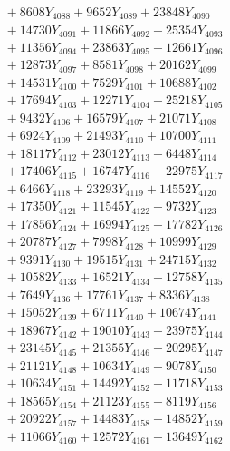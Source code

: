 \documentclass[a4paper,10pt]{article}
\begin{document}
{\begin{align}
&\;  + 8608 Y_{4088} + 9652 Y_{4089} + 23848 Y_{4090} \\[0.3ex]
&\;  + 14730 Y_{4091} + 11866 Y_{4092} + 25354 Y_{4093} \\[0.3ex]
&\;  + 11356 Y_{4094} + 23863 Y_{4095} + 12661 Y_{4096} \\[0.3ex]
&\;  + 12873 Y_{4097} + 8581 Y_{4098} + 20162 Y_{4099} \\[0.3ex]
&\;  + 14531 Y_{4100} + 7529 Y_{4101} + 10688 Y_{4102} \\[0.3ex]
&\;  + 17694 Y_{4103} + 12271 Y_{4104} + 25218 Y_{4105} \\[0.3ex]
&\;  + 9432 Y_{4106} + 16579 Y_{4107} + 21071 Y_{4108} \\[0.5ex]\allowbreak
&\;  + 6924 Y_{4109} + 21493 Y_{4110} + 10700 Y_{4111} \\[0.3ex]
&\;  + 18117 Y_{4112} + 23012 Y_{4113} + 6448 Y_{4114} \\[0.3ex]
&\;  + 17406 Y_{4115} + 16747 Y_{4116} + 22975 Y_{4117} \\[0.3ex]
&\;  + 6466 Y_{4118} + 23293 Y_{4119} + 14552 Y_{4120} \\[0.3ex]
&\;  + 17350 Y_{4121} + 11545 Y_{4122} + 9732 Y_{4123} \\[0.3ex]
&\;  + 17856 Y_{4124} + 16994 Y_{4125} + 17782 Y_{4126} \\[0.3ex]
&\;  + 20787 Y_{4127} + 7998 Y_{4128} + 10999 Y_{4129} \\[0.3ex]
&\;  + 9391 Y_{4130} + 19515 Y_{4131} + 24715 Y_{4132} \\[0.3ex]
&\;  + 10582 Y_{4133} + 16521 Y_{4134} + 12758 Y_{4135} \\[0.3ex]
&\;  + 7649 Y_{4136} + 17761 Y_{4137} + 8336 Y_{4138} \\[0.5ex]\allowbreak
&\;  + 15052 Y_{4139} + 6711 Y_{4140} + 10674 Y_{4141} \\[0.3ex]
&\;  + 18967 Y_{4142} + 19010 Y_{4143} + 23975 Y_{4144} \\[0.3ex]
&\;  + 23145 Y_{4145} + 21355 Y_{4146} + 20295 Y_{4147} \\[0.3ex]
&\;  + 21121 Y_{4148} + 10634 Y_{4149} + 9078 Y_{4150} \\[0.3ex]
&\;  + 10634 Y_{4151} + 14492 Y_{4152} + 11718 Y_{4153} \\[0.3ex]
&\;  + 18565 Y_{4154} + 21123 Y_{4155} + 8119 Y_{4156} \\[0.3ex]
&\;  + 20922 Y_{4157} + 14483 Y_{4158} + 14852 Y_{4159} \\[0.3ex]
&\;  + 11066 Y_{4160} + 12572 Y_{4161} + 13649 Y_{4162} \\[0.3ex]

\end{align}}
\end{document}
